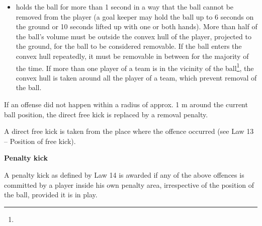 \begin{itemize}
\item {}holds the ball for more than 1 second in a way that the
  ball cannot be removed from the player (a goal keeper may hold the ball up to
  6 seconds on the ground or 10 seconds lifted up with one or both hands). More than half of the ball's volume must be outside
  the convex hull of the player, projected to the ground, for the ball to be
  considered removable. If the ball enters the convex hull repeatedly, it must
  be removable in between for the majority of the time. If more than one player
  of a team is in the vicinity of the ball\footnote{
  }, the convex hull is taken around all
  the player of a team, which prevent removal of the ball.
\end{itemize}

\bigskip

If an offense did not happen within a radius of approx. 1 m
around the current ball position, the direct free kick is replaced by a removal
penalty.

\bigskip



\bigskip


A direct free kick is taken from the place where the offence occurred (see Law 13 -- Position of free kick). 



\bigskip

{\bfseries Penalty kick}

\headlinebox

A penalty kick as defined by Law 14 is awarded if any of the above 
offences is committed by a player inside his own penalty area,
irrespective of the position of the ball, provided it is in play.


